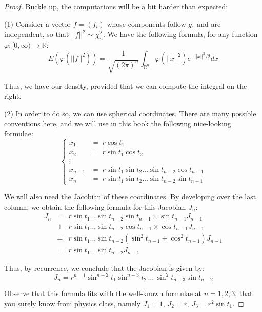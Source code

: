 \documentclass[10pt,a4paper]{amsart}
\begin{document}
\begin{proof}
Buckle up, the computations will be a bit harder than expected:

\medskip

(1) Consider a vector $f=(f_i)$ whose components follow $g_1$ and are independent, so that $||f||^2\sim\chi_n^2$. We have the following formula, for any function $\varphi:[0,\infty)\to\mathbb R$:
$$E\left(\varphi(||f||^2)\right)
=\frac{1}{\sqrt{(2\pi)^n}}\int_{\mathbb R^n}\varphi(||x||^2)e^{-||x||^2/2}dx$$

Thus, we have our density, provided that we can compute the integral on the right.

\medskip

(2) In order to do so, we can use spherical coordinates. There are many possible conventions here, and we will use in this book the following nice-looking formulae:
$$\begin{cases}
x_1\!\!\!&=\ r\cos t_1\\
x_2\!\!\!&=\ r\sin t_1\cos t_2\\
\vdots\\
x_{n-1}\!\!\!&=\ r\sin t_1\sin t_2\ldots\sin t_{n-2}\cos t_{n-1}\\
x_n\!\!\!&=\ r\sin t_1\sin t_2\ldots\sin t_{n-2}\sin t_{n-1}
\end{cases}$$

We will also need the Jacobian of these coordinates. By developing over the last column, we obtain the following formula for this Jacobian $J_n$:
\begin{eqnarray*}
J_n
&=&r\sin t_1\ldots\sin t_{n-2}\sin t_{n-1}\times \sin t_{n-1}J_{n-1}\\
&+&r\sin t_1\ldots \sin t_{n-2}\cos t_{n-1}\times\cos t_{n-1}J_{n-1}\\
&=&r\sin t_1\ldots\sin t_{n-2}(\sin^2 t_{n-1}+\cos^2 t_{n-1})J_{n-1}\\
&=&r\sin t_1\ldots\sin t_{n-2}J_{n-1}
\end{eqnarray*}

Thus, by recurrence, we conclude that the Jacobian is given by:
$$J_n=r^{n-1}\sin^{n-2}t_1\sin^{n-3}t_2\,\ldots\,\sin^2t_{n-3}\sin t_{n-2}$$

Observe that this formula fits with the well-known formulae at $n=1,2,3$, that you surely know from physics class, namely $J_1=1$, $J_2=r$, $J_3=r^2\sin t_1$.

\medskip


\end{proof}
\end{document}
